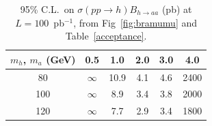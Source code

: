 \documentclass[aps,12pt,superscriptaddress,nofootinbib,floatfix,showpacs]{revtex4}
\begin{document}
\begin{table}[htb]
\caption{95\% C.L.\ on $\sigma(pp \to h) B_{h \to aa}$ (pb) at $L = 100$~pb$^{-1}$, from Fig~\ref{fig:bramumu} and Table~\ref{acceptance}. \label{table_both_factorized}}
\begin{center}
\renewcommand{\arraystretch}{1.3}
\begin{tabular}{| c | c | c | c | c | c |}
\hline
\mbox{\hspace{0.25 cm}}$m_h$, $m_a$ (GeV)\mbox{\hspace{0.25 cm}} & \mbox{\hspace{0.25 cm}}0.5\mbox{\hspace{0.25 cm}} & \mbox{\hspace{0.25 cm}}1.0\mbox{\hspace{0.25 cm}} & \mbox{\hspace{0.25 cm}}2.0\mbox{\hspace{0.25 cm}} & \mbox{\hspace{0.25 cm}}3.0\mbox{\hspace{0.25 cm}} & \mbox{\hspace{0.25 cm}}4.0\mbox{\hspace{0.25 cm}} \\\hline
80 & $\infty$ & 10.9 & 4.1 & 4.6 & 2400 \\\hline
100 & $\infty$ & 8.9 & 3.4 & 3.8 & 2000 \\\hline
120 & $\infty$ & 7.7 & 2.9 & 3.4 & 1800 \\\hline
\end{tabular}
\end{center}
\end{table}
\end{document}
